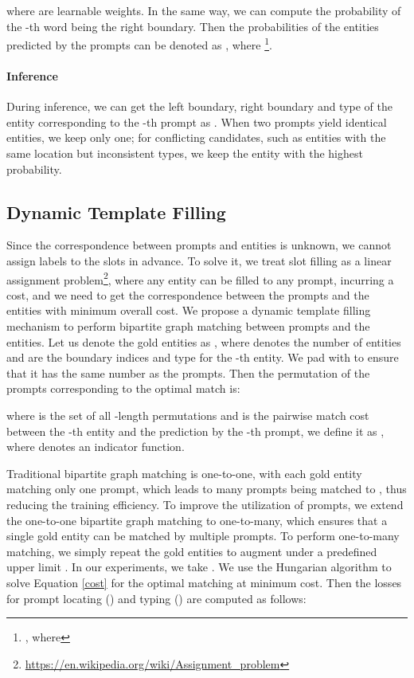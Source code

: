 \documentclass[11pt]{article}
\begin{document}
 
\noindent where  are learnable weights. In the same way, we can compute the probability  of the -th word being the right boundary. Then the probabilities of the entities predicted by the  prompts can be denoted as , where  \footnote{\;, where }.


\paragraph{Inference} During inference, we can get the left boundary, right boundary and type of the entity corresponding to the -th prompt as . When two prompts yield identical entities, we keep only one; for conflicting candidates, such as entities with the same location but inconsistent types, we keep the entity with the highest probability. 



\subsection{Dynamic Template Filling}
\label{3.4}

Since the correspondence between prompts and entities is unknown, we cannot assign labels to the slots in advance.
To solve it, we treat slot filling as a linear assignment problem\footnote{\;\url{https://en.wikipedia.org/wiki/Assignment_problem}}, where any entity can be filled to any prompt, incurring a cost, and we need to get the correspondence between the prompts and the entities with minimum overall cost. We propose a dynamic template filling mechanism to perform bipartite graph matching between prompts and the entities.
Let us denote the gold entities as , where  denotes the number of entities and  are the boundary indices and type for the -th entity. We pad  with  to ensure that it has the same number  as the prompts. Then the permutation of the prompts corresponding to the optimal match is:


\noindent where  is the set of all -length permutations and   is the pairwise match cost between the -th entity and the prediction by the -th prompt, we define it as , where  denotes an indicator function. 

Traditional bipartite graph matching is one-to-one, with each gold entity matching only one prompt, which leads to many prompts being matched to , thus reducing the training efficiency. To improve the utilization of prompts, we extend the one-to-one bipartite graph matching to one-to-many, which ensures that a single gold entity can be matched by multiple prompts. To perform one-to-many matching, we simply repeat the gold entities to augment  under a predefined upper limit . In our experiments, we take .
We use the Hungarian algorithm \citep{kuhn1955hungarian} to solve Equation \ref{cost} for the optimal matching  at minimum cost. Then the losses for prompt locating () and typing () are computed as follows:
\end{document}
